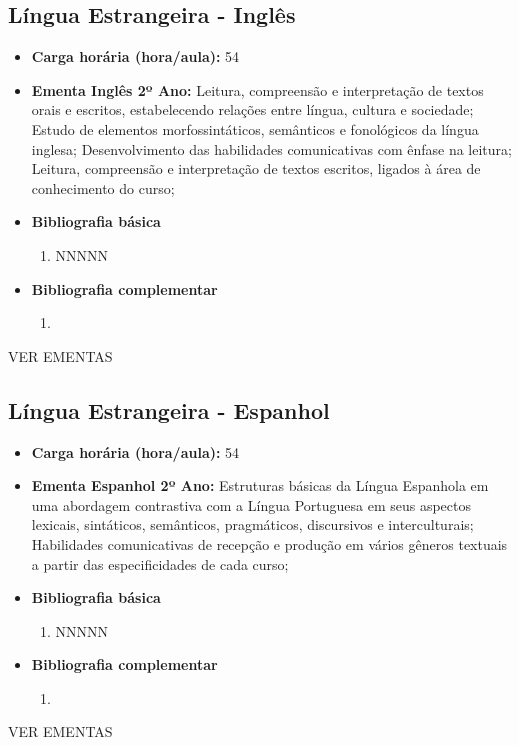 \documentclass[11pt,fleqn]{book} %
\newcommand{\VER}[1]{\begingroup\color{red}#1\endgroup}
\begin{document}
\newpage
\subsection{Língua Estrangeira - Inglês}\label{disc:ingles}
\begin{itemize}
	\item \textbf{Carga horária (hora/aula):} 54
	\item \textbf{Ementa Inglês 2º Ano:} 
	Leitura, compreensão e interpretação de textos orais e escritos, estabelecendo relações entre língua, cultura e sociedade;
	Estudo de elementos morfossintáticos, semânticos e fonológicos da língua inglesa;
	Desenvolvimento das habilidades comunicativas com ênfase na leitura;
	Leitura, compreensão e interpretação de textos escritos, ligados à área de conhecimento do curso;
	\item \textbf{Bibliografia básica}
	\begin{enumerate}
		\item NNNNN
	\end{enumerate}
	\item \textbf{Bibliografia complementar}
	\begin{enumerate}
		\item 
	\end{enumerate}	
\end{itemize}
\VER{VER EMENTAS}

\newpage
\subsection{Língua Estrangeira - Espanhol}\label{disc:espanhol}
\begin{itemize}
	\item \textbf{Carga horária (hora/aula):} 54
	\item \textbf{Ementa Espanhol 2º Ano:} 
	Estruturas básicas da Língua Espanhola em uma abordagem contrastiva com a Língua Portuguesa em seus aspectos lexicais, sintáticos, semânticos, pragmáticos, discursivos e interculturais; 
	Habilidades comunicativas de recepção e produção em vários gêneros textuais a partir das especificidades de cada curso;	
	\item \textbf{Bibliografia básica}
	\begin{enumerate}
		\item NNNNN
	\end{enumerate}
	\item \textbf{Bibliografia complementar}
	\begin{enumerate}
		\item 
	\end{enumerate}	
\end{itemize}
\VER{VER EMENTAS}
\end{document}
